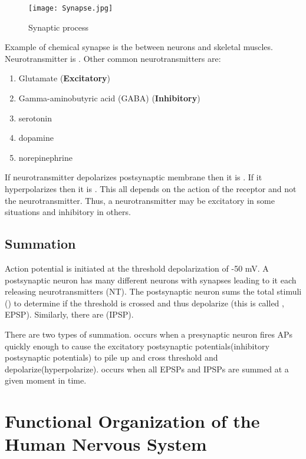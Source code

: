 \documentclass[../Psych_Soci_review.tex]{subfiles}
\begin{document}
\begin{figure}[h]
  \centering
  \texttt{[image: Synapse.jpg]}
  \caption{Synaptic process}
  \label{synapse}
\end{figure}

Example of chemical synapse is the  between
neurons and skeletal muscles. Neurotransmitter is .
Other common neurotransmitters are:
\begin{enumerate}
  \item Glutamate (\textbf{Excitatory})
  \item Gamma-aminobutyric acid (GABA) (\textbf{Inhibitory})
  \item serotonin
  \item dopamine
  \item norepinephrine
\end{enumerate} 

If neurotransmitter depolarizes postsynaptic membrane then it is
. If it hyperpolarizes then it is . This all
depends on the action of the receptor and not the neurotransmitter. Thus, a
neurotransmitter may be excitatory in some situations and inhibitory in others.

\subsection{Summation}

Action potential is initiated at the threshold depolarization of -50 mV. A
postsynaptic neuron has many different neurons with synapses leading to it each
releasing neurotransmitters (NT). The postsynaptic neuron sums the total stimuli
() to determine if the threshold is crossed and thus
depolarize (this is called , EPSP).
Similarly, there are  (IPSP).

There are two types of summation.  occurs
when a presynaptic neuron fires APs quickly enough to cause the excitatory
postsynaptic potentials(inhibitory postsynaptic potentials) to pile up and cross
threshold and depolarize(hyperpolarize). 
occurs when all EPSPs and IPSPs are summed at a given moment in time.

\section{Functional Organization of the Human Nervous System}
\end{document}

